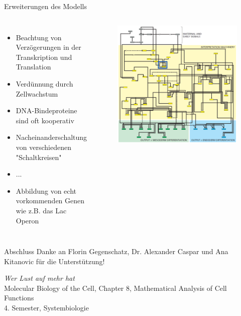 \documentclass[11pt,aspectratio=169,reqno]{beamer}
\begin{document}
\begin{frame}{Erweiterungen des Modells}
    \begin{columns}
        \begin{itemize}
            \item Beachtung von Verzögerungen in der Transkription und Translation
            \item Verdünnung durch Zellwachstum
            \item DNA-Bindeproteine sind oft kooperativ
            \item Nacheinanderschaltung von verschiedenen "Schaltkreisen"
            \item ...
            \item Abbildung von echt vorkommenden Genen wie z.B. das Lac Operon
        \end{itemize}
        
        \begin{figure}
            \centering
            \includegraphics[width=\textwidth]{images/network.png}
        \end{figure}
    \end{columns}
\end{frame}

\begin{frame}{Abschluss}
    \centering
    Danke an Florin Gegenschatz, Dr. Alexander Caspar und Ana Kitanovic für die Unterstützung!

    \vspace{4em}
    \emph{Wer Lust auf mehr hat}\\[1em] 
    Molecular Biology of the Cell, Chapter 8, Mathematical Analysis of Cell Functions\\[.5em]
    4. Semester, Systembiologie
\end{frame}
\end{document}

